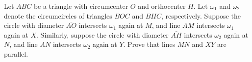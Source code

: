 Let $ABC$ be a triangle with circumcenter $O$ and orthocenter $H$. Let $\omega_1$ and $\omega_2$ denote the circumcircles of triangles $BOC$ and $BHC$, respectively. Suppose the circle with diameter $\overline{AO}$ intersects $\omega_1$ again at $M$, and line $AM$ intersects $\omega_1$ again at $X$. Similarly, suppose the circle with diameter $\overline{AH}$ intersects $\omega_2$ again at $N$, and line $AN$ intersects $\omega_2$ again at $Y$. Prove that lines $MN$ and $XY$ are parallel.